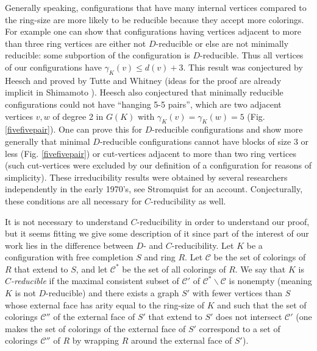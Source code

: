 \documentclass[11pt]{article}
\newcommand{\mcal}{\mathcal}
\newcommand{\back}{\backslash}
\newcommand{\gm}{\gamma}
\begin{document}
Generally speaking, configurations that have many internal vertices compared to the ring-size are more likely to be reducible because they accept more colorings. For example one can show that configurations having vertices adjacent to more than three ring vertices
are either not $D$-reducible or else are not minimally reducible: some subportion of the configuration is $D$-reducible. Thus all vertices of our configurations have $\gamma_K(v) \leq d(v) + 3$. This result was conjectured by Heesch \cite{heesch} and proved by Tutte and Whitney \cite{tutte} (ideas for the proof are already implicit in Shimamoto \cite{shimamoto}). Heesch also conjectured that minimally reducible configurations could not have ``hanging 5-5 pairs'', which are two adjacent vertices $v, w$ of degree 2 in $G(K)$ with $\gm_K(v) = \gm_K(w) = 5$  (Fig$.$ \ref{fivefivepair}). One can prove this for $D$-reducible configurations and show more generally that minimal $D$-reducible configurations cannot have blocks of size 3 or less (Fig$.$ \ref{fivefivepair}) or cut-vertices adjacent to more than two ring vertices
(such cut-vertices were excluded by our definition of a configuration for reasons of simplicity). These irreducibility results were obtained by several researchers independently in the early 1970's, see Stromquist \cite{stromquist} for an account. Conjecturally, these conditions are all necessary for $C$-reducibility as well.

It is not necessary to understand $C$-reducibility in order to understand our proof, but it seems fitting we give some description of it since part of the interest of our work lies in the difference between $D$- and $C$-reducibility. Let $K$ be a configuration with free completion $S$ and ring $R$. Let $\mcal{C}$ be the set of colorings of $R$ that extend to $S$, and let $\mcal{C}^*$ be the set of all colorings of $R$. We say that $K$ is \emph{$C$-reducible} if the maximal consistent subset of $\mcal{C}'$ of $\mcal{C}^*\back \mcal{C}$ is nonempty (meaning $K$ is not $D$-reducible) and there exists a graph $S'$ with fewer vertices than $S$ whose external face has arity equal to the ring-size of $K$ and such that the set of colorings $\mcal{C}''$ of the external face of $S'$ that extend to $S'$ does not intersect $\mcal{C}'$ 
(one makes the set of colorings of the external face of $S'$ correspond to a set of colorings $\mcal{C}''$ of $R$ by wrapping $R$ around the external face of $S'$). 
\end{document}
